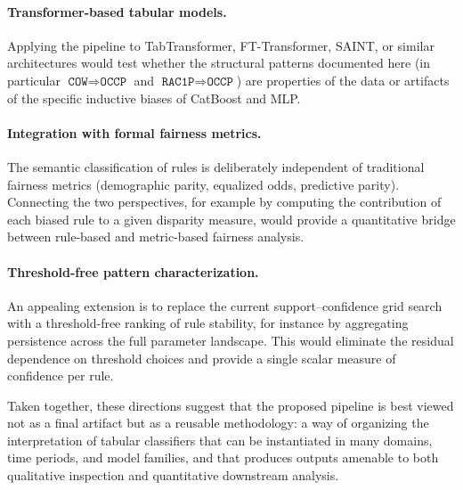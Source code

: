 \paragraph{Transformer-based tabular models.} Applying the pipeline to TabTransformer, FT-Transformer, SAINT, or similar architectures would test whether the structural patterns documented here (in particular $\texttt{COW} \Rightarrow \texttt{OCCP}$ and $\texttt{RAC1P} \Rightarrow \texttt{OCCP}$) are properties of the data or artifacts of the specific inductive biases of CatBoost and MLP.

\paragraph{Integration with formal fairness metrics.} The semantic classification of rules is deliberately independent of traditional fairness metrics (demographic parity, equalized odds, predictive parity). Connecting the two perspectives, for example by computing the contribution of each biased rule to a given disparity measure, would provide a quantitative bridge between rule-based and metric-based fairness analysis.

\paragraph{Threshold-free pattern characterization.} An appealing extension is to replace the current support--confidence grid search with a threshold-free ranking of rule stability, for instance by aggregating persistence across the full parameter landscape. This would eliminate the residual dependence on threshold choices and provide a single scalar measure of confidence per rule.

Taken together, these directions suggest that the proposed pipeline is best viewed not as a final artifact but as a reusable methodology: a way of organizing the interpretation of tabular classifiers that can be instantiated in many domains, time periods, and model families, and that produces outputs amenable to both qualitative inspection and quantitative downstream analysis.